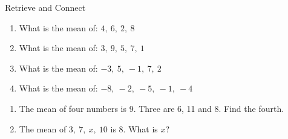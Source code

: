 \documentclass{beamer}
\newcommand{\ashow}[1]{\uncover<2->{\textcolor{red}{\small #1}}}
\newcommand{\ashowq}[1]{\alt<2->{\textcolor{red}{\small #1}}{?}}
\begin{document}
\begin{frame}{Retrieve and Connect}
\vspace{-0.8em}

\footnotesize
\vspace{0.2em}
\begin{enumerate}\itemsep1pt
  \vspace{-1em}
  \item What is the mean of: $4,\ 6,\ 2,\ 8$ \ashow{5}
  \item What is the mean  of: $3,\ 9,\ 5,\ 7,\ 1$ \ashow{5}
  \item What is the mean  of: $-3,\ 5,\ -1,\ 7,\ 2$ \ashow{2}
  \item What is the mean  of: $-8,\ -2,\ -5,\ -1,\ -4$ \ashow{$-4$}
\end{enumerate}

\begin{enumerate}\itemsep1pt
  \setcounter{enumi}8
  \item The mean of four numbers is 9. Three are 6, 11 and 8. Find the fourth. \ashow{11}
  \item The mean of $3,\ 7,\ x,\ 10$ is $8$. What is $x$? \ashow{12}
\end{enumerate}


\end{frame}
\end{document}
